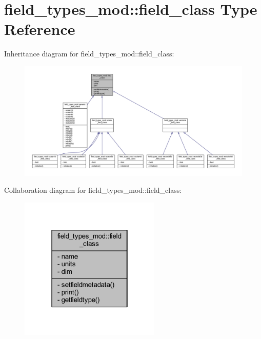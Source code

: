 \hypertarget{structfield__types__mod_1_1field__class}{}\section{field\+\_\+types\+\_\+mod\+:\+:field\+\_\+class Type Reference}
\label{structfield__types__mod_1_1field__class}


Inheritance diagram for field\+\_\+types\+\_\+mod\+:\+:field\+\_\+class\+:
\nopagebreak
\begin{figure}[H]
\begin{center}
\leavevmode
\includegraphics[width=350pt]{structfield__types__mod_1_1field__class__inherit__graph}
\end{center}
\end{figure}


Collaboration diagram for field\+\_\+types\+\_\+mod\+:\+:field\+\_\+class\+:
\nopagebreak
\begin{figure}[H]
\begin{center}
\leavevmode
\includegraphics[width=190pt]{structfield__types__mod_1_1field__class__coll__graph}
\end{center}
\end{figure}

